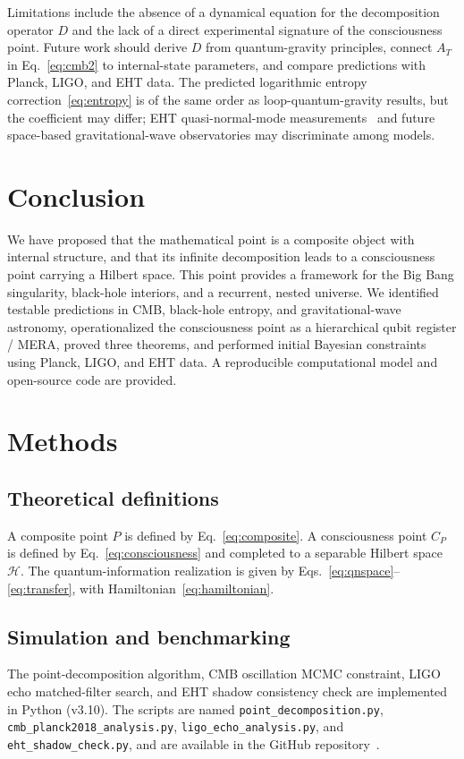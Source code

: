 \documentclass[11pt,a4paper]{article}
\theoremstyle{plain}
\begin{document}
Limitations include the absence of a dynamical equation for the decomposition operator $D$ and the lack of a direct experimental signature of the consciousness point. Future work should derive $D$ from quantum-gravity principles, connect $A_T$ in Eq.~\eqref{eq:cmb2} to internal-state parameters, and compare predictions with Planck, LIGO, and EHT data. The predicted logarithmic entropy correction~\eqref{eq:entropy} is of the same order as loop-quantum-gravity results, but the coefficient may differ; EHT quasi-normal-mode measurements~\cite{eht2019} and future space-based gravitational-wave observatories may discriminate among models.

\section{Conclusion}

We have proposed that the mathematical point is a composite object with internal structure, and that its infinite decomposition leads to a consciousness point carrying a Hilbert space. This point provides a framework for the Big Bang singularity, black-hole interiors, and a recurrent, nested universe. We identified testable predictions in CMB, black-hole entropy, and gravitational-wave astronomy, operationalized the consciousness point as a hierarchical qubit register / MERA, proved three theorems, and performed initial Bayesian constraints using Planck, LIGO, and EHT data. A reproducible computational model and open-source code are provided.

\section{Methods}

\subsection{Theoretical definitions}
A composite point $P$ is defined by Eq.~\eqref{eq:composite}. A consciousness point $C_P$ is defined by Eq.~\eqref{eq:consciousness} and completed to a separable Hilbert space $\mathcal{H}$. The quantum-information realization is given by Eqs.~\eqref{eq:qnspace}--\eqref{eq:transfer}, with Hamiltonian~\eqref{eq:hamiltonian}.

\subsection{Simulation and benchmarking}
The point-decomposition algorithm, CMB oscillation MCMC constraint, LIGO echo matched-filter search, and EHT shadow consistency check are implemented in Python (v3.10). The scripts are named \texttt{point\_decomposition.py}, \texttt{cmb\_planck2018\_analysis.py}, \texttt{ligo\_echo\_analysis.py}, and \texttt{eht\_shadow\_check.py}, and are available in the GitHub repository~\cite{li2026}.
\end{document}
